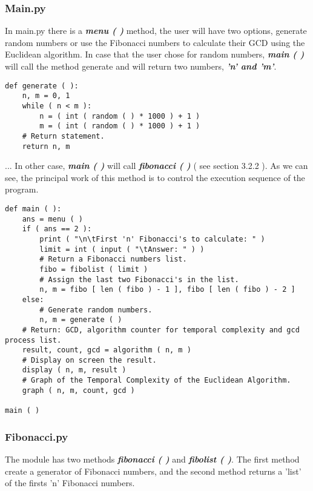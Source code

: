 \documentclass[10pt,a4paper]{article}
\begin{document}
\subsubsection{Main.py}

In main.py there is a {\bfseries\itshape menu ( )} method, the user will have two options, generate random numbers or use the Fibonacci numbers to calculate their GCD using the Euclidean algorithm. In case that the user chose for random numbers, {\bfseries\itshape main ( )} will call the method generate and will return two numbers, {\bfseries\itshape 'n' and 'm'}. \hfill \break

\begin{lstlisting}
def generate ( ):
    n, m = 0, 1
    while ( n < m ):
        n = ( int ( random ( ) * 1000 ) + 1 )
        m = ( int ( random ( ) * 1000 ) + 1 )
    # Return statement.
    return n, m
\end{lstlisting} \hfill

... In other case, {\bfseries\itshape main ( )} will call {\bfseries\itshape fibonacci ( )} ( see section 3.2.2 ). As we can see, the principal work of this method is to control the execution sequence of the program. \hfill \break

\begin{lstlisting}
def main ( ):
    ans = menu ( )
    if ( ans == 2 ):
        print ( "\n\tFirst 'n' Fibonacci's to calculate: " )
        limit = int ( input ( "\tAnswer: " ) )
        # Return a Fibonacci numbers list.
        fibo = fibolist ( limit )
        # Assign the last two Fibonacci's in the list.
        n, m = fibo [ len ( fibo ) - 1 ], fibo [ len ( fibo ) - 2 ]
    else:
        # Generate random numbers.
        n, m = generate ( )
    # Return: GCD, algorithm counter for temporal complexity and gcd process list.
    result, count, gcd = algorithm ( n, m )
    # Display on screen the result.
    display ( n, m, result )
    # Graph of the Temporal Complexity of the Euclidean Algorithm.
    graph ( n, m, count, gcd )

main ( )
\end{lstlisting} 

\pagebreak

\subsubsection{Fibonacci.py}

The module has two methods {\bfseries\itshape fibonacci ( )} and {\bfseries\itshape fibolist ( )}. The first method create a generator of Fibonacci numbers, and the second method returns a 'list' of the firsts 'n' Fibonacci numbers. \hfill \break
\end{document}
